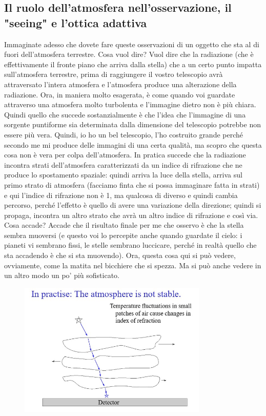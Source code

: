 \documentclass[a4paper,11pt]{article}
\begin{document}
\subsection{Il ruolo dell'atmosfera nell'osservazione, il "seeing" e l'ottica adattiva}
Immaginate adesso che dovete fare queste osservazioni di un oggetto che sta al di fuori dell’atmosfera terrestre. Cosa vuol dire? Vuol dire che la radiazione (che è effettivamente il fronte piano che arriva dalla stella) che a un certo punto impatta sull’atmosfera terrestre, prima di raggiungere il vostro telescopio avrà attraversato l’intera atmosfera e l'atmosfera produce una alterazione della radiazione. Ora, in maniera molto esagerata, è come quando voi guardate attraverso una atmosfera molto turbolenta e l’immagine dietro non è più chiara. Quindi quello che succede sostanzialmente è che l’idea che l’immagine di una sorgente puntiforme sia determinata dalla dimensione del telescopio potrebbe non essere più vera. Quindi, io ho un bel telescopio, l’ho costruito grande perché secondo me mi produce delle immagini di una certa qualità, ma scopro che questa cosa non è vera per colpa dell’atmosfera. In pratica succede che la radiazione incontra strati dell’atmosfera caratterizzati da un indice di rifrazione che ne produce lo spostamento spaziale: quindi arriva la luce della stella, arriva sul primo strato di atmosfera (facciamo finta che si possa immaginare fatta in strati) e qui l’indice di rifrazione non è 1, ma qualcosa di diverso e quindi cambia percorso, perché l’effetto è quello di avere una variazione della direzione; quindi si propaga, incontra un altro strato che avrà un altro indice di rifrazione e così via. Cosa accade? Accade che il risultato finale per me che osservo è che la stella sembra muoversi (e questo voi lo percepite anche quando guardate il cielo: i pianeti vi sembrano fissi, le stelle sembrano luccicare, perché in realtà quello che sta accadendo è che si sta muovendo). Ora, questa cosa qui si può vedere, ovviamente, come la matita nel bicchiere che si spezza. Ma si può anche vedere in un altro modo un po’ più sofisticato.

\begin{figure}[h!!]
        \centering
        \includegraphics[width=9cm]{19.jpg}
        \label{}
    \end{figure}
\end{document}
